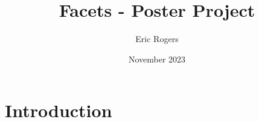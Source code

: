 \documentclass{article}
\title{Facets - Poster Project}
\author{Eric Rogers}
\date{November 2023}
\begin{document}
\maketitle

\section{Introduction}
\end{document}
